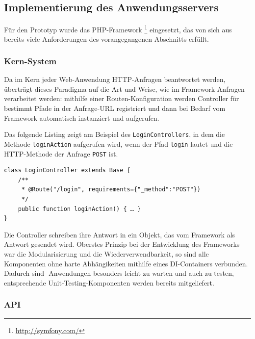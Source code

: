 \pagebreak

\subsection{Implementierung des Anwendungsservers}\label{l:implementierung-server}

Für den Prototyp wurde das PHP-Framework \footnote{\url{http://symfony.com/}} eingesetzt, das von sich aus bereits viele Anforderungen des vorangegangenen Abschnitts erfüllt. 

\subsubsection{Kern-System}

Da im Kern jeder Web-Anwendung HTTP-Anfragen beantwortet werden, überträgt  dieses Paradigma auf die Art und Weise, wie im Framework Anfragen verarbeitet werden: mithilfe einer Routen-Konfiguration werden Controller für bestimmt Pfade in der Anfrage-URL registriert und dann bei Bedarf vom Framework automatisch instanziert und aufgerufen. 

Das folgende Listing zeigt am Beispiel des \texttt{LoginControllers}, in dem die Methode \texttt{loginAction} aufgerufen wird, wenn der Pfad \texttt{\/login} lautet und die HTTP-Methode der Anfrage \texttt{POST} ist.

\begin{samepage}
\begin{verbatim}
class LoginController extends Base {
    /**
     * @Route("/login", requirements={"_method":"POST"})
     */
    public function loginAction() { … }
}
\end{verbatim}
\end{samepage}

Die Controller schreiben ihre Antwort in ein Objekt, das vom Framework als Antwort gesendet wird. Oberstes Prinzip bei der Entwicklung des Frameworks war die Modularisierung und die Wiederverwendbarkeit, so sind alle Komponenten ohne harte Abhängikeiten mithilfe eines DI-Containers verbunden. Dadurch sind -Anwendungen besonders leicht zu warten und auch zu testen, entsprechende Unit-Testing-Komponenten werden bereits mitgeliefert.

\subsubsection{API}\label{l:api-implementierung}

